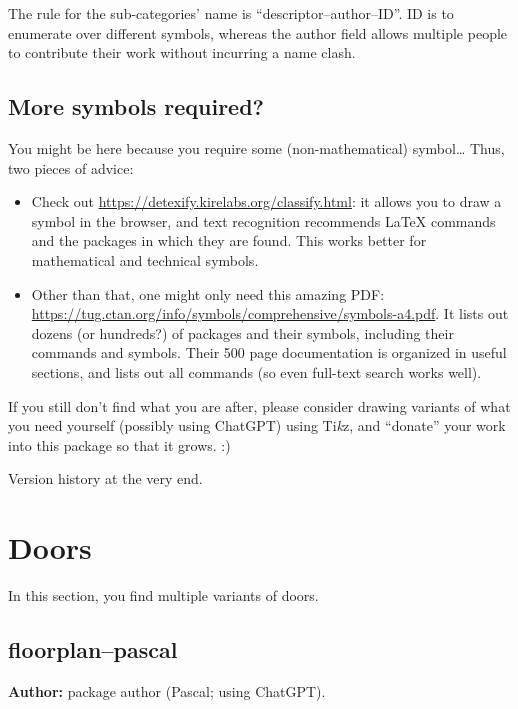 \documentclass{article}
\begin{document}
The rule for the sub-categories' name is ``descriptor--author--ID''. ID is to enumerate over different symbols, whereas the author field allows multiple people to contribute their work without incurring a name clash.

\subsection*{More symbols required?}

You might be here because you require some (non-mathematical) symbol\dots{} Thus, two pieces of advice:

\begin{itemize}
  \item Check out \url{https://detexify.kirelabs.org/classify.html}: it allows you to draw a symbol in the browser, and text recognition recommends \LaTeX{} commands and the packages in which they are found. This works better for mathematical and technical symbols.
  \item Other than that, one might only need this amazing PDF:
  \url{https://tug.ctan.org/info/symbols/comprehensive/symbols-a4.pdf}. 
  It lists out dozens (or hundreds?) of packages and their symbols, including their commands and symbols. Their 500 page documentation is organized in useful sections, and lists out all commands (so even full-text search works well).
\end{itemize}

If you still don't find what you are after, please consider drawing variants of what you need yourself (possibly using ChatGPT) using Ti\textit{k}z, and ``donate'' your work into this package so that it grows. :)

Version history at the very end.

\clearpage

\section{Doors}

In this section, you find multiple variants of doors.


\subsection{floorplan--pascal}

\textbf{Author:} package author (Pascal; using ChatGPT).
\end{document}
